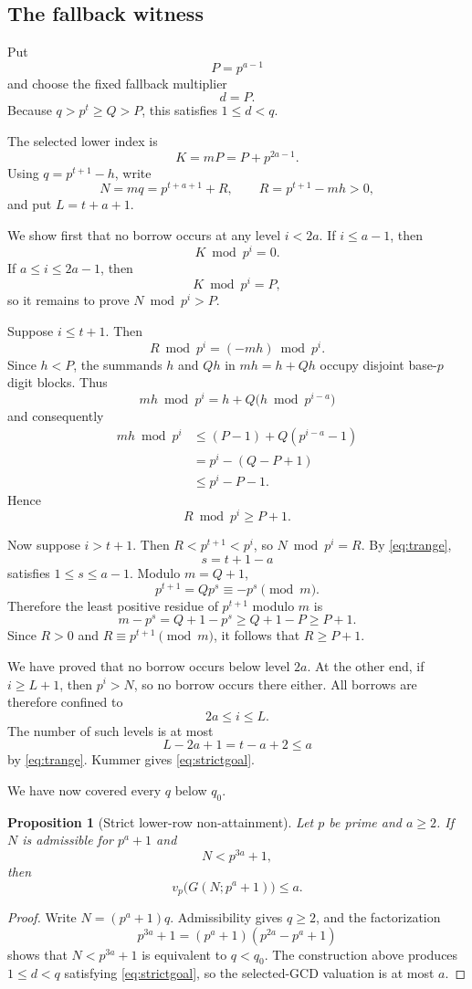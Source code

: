 \documentclass[11pt]{article}
\newtheorem{proposition}[theorem]{Proposition}
\theoremstyle{definition}
\theoremstyle{remark}
\begin{document}
\subsection{The fallback witness}

Put
\[
  P=p^{a-1}
\]
and choose the fixed fallback multiplier
\[
  d=P.
\]
Because $q>p^t\ge Q>P$, this satisfies $1\le d<q$.

The selected lower index is
\[
  K=mP=P+p^{2a-1}.
\]
Using $q=p^{t+1}-h$, write
\[
  N=mq=p^{t+a+1}+R,
  \qquad R=p^{t+1}-mh>0,
\]
and put $L=t+a+1$.

We show first that no borrow occurs at any level $i<2a$. If $i\le a-1$, then
\[
  K\bmod p^i=0.
\]
If $a\le i\le2a-1$, then
\[
  K\bmod p^i=P,
\]
so it remains to prove $N\bmod p^i>P$.

Suppose $i\le t+1$. Then
\[
  R\bmod p^i=(-mh)\bmod p^i.
\]
Since $h<P$, the summands $h$ and $Qh$ in $mh=h+Qh$ occupy disjoint base-$p$ digit blocks. Thus
\[
  mh\bmod p^i
  =h+Q\bigl(h\bmod p^{i-a}\bigr)
\]
and consequently
\begin{align*}
  mh\bmod p^i
  &\le(P-1)+Q(p^{i-a}-1)\\
  &=p^i-(Q-P+1)\\
  &\le p^i-P-1.
\end{align*}
Hence
\[
  R\bmod p^i\ge P+1.
\]

Now suppose $i>t+1$. Then $R<p^{t+1}<p^i$, so $N\bmod p^i=R$. By \eqref{eq:trange},
\[
  s=t+1-a
\]
satisfies $1\le s\le a-1$. Modulo $m=Q+1$,
\[
  p^{t+1}=Qp^s\equiv-p^s\pmod m.
\]
Therefore the least positive residue of $p^{t+1}$ modulo $m$ is
\[
  m-p^s=Q+1-p^s\ge Q+1-P\ge P+1.
\]
Since $R>0$ and $R\equiv p^{t+1}\pmod m$, it follows that $R\ge P+1$.

We have proved that no borrow occurs below level $2a$. At the other end, if $i\ge L+1$, then $p^i>N$, so no borrow occurs there either. All borrows are therefore confined to
\[
  2a\le i\le L.
\]
The number of such levels is at most
\[
  L-2a+1=t-a+2\le a
\]
by \eqref{eq:trange}. Kummer gives \eqref{eq:strictgoal}.

We have now covered every $q$ below $q_0$.

\begin{proposition}[Strict lower-row non-attainment]\label{prop:lowernon}
Let $p$ be prime and $a\ge2$. If $N$ is admissible for $p^a+1$ and
\[
  N<p^{3a}+1,
\]
then
\[
  v_p\bigl(G(N;p^a+1)\bigr)\le a.
\]
\end{proposition}

\begin{proof}
Write $N=(p^a+1)q$. Admissibility gives $q\ge2$, and the factorization
\[
  p^{3a}+1=(p^a+1)(p^{2a}-p^a+1)
\]
shows that $N<p^{3a}+1$ is equivalent to $q<q_0$. The construction above produces $1\le d<q$ satisfying \eqref{eq:strictgoal}, so the selected-GCD valuation is at most $a$.
\end{proof}
\end{document}
